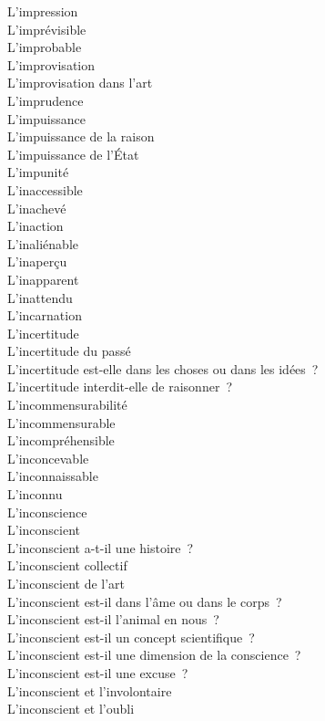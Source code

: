\documentclass[a4paper,12pt]{article}
\begin{document}
L'impression \\
L'imprévisible \\
L'improbable \\
L'improvisation \\
L'improvisation dans l'art \\
L'imprudence \\
L'impuissance \\
L'impuissance de la raison \\
L'impuissance de l'État \\
L'impunité \\
L'inaccessible \\
L'inachevé \\
L'inaction \\
L'inaliénable \\
L'inaperçu \\
L'inapparent \\
L'inattendu \\
L'incarnation \\
L'incertitude \\
L'incertitude du passé \\
L'incertitude est-elle dans les choses ou dans les idées ? \\
L'incertitude interdit-elle de raisonner ? \\
L'incommensurabilité \\
L'incommensurable \\
L'incompréhensible \\
L'inconcevable \\
L'inconnaissable \\
L'inconnu \\
L'inconscience \\
L'inconscient \\
L'inconscient a-t-il une histoire ? \\
L'inconscient collectif \\
L'inconscient de l'art \\
L'inconscient est-il dans l'âme ou dans le corps ? \\
L'inconscient est-il l'animal en nous ? \\
L'inconscient est-il un concept scientifique ? \\
L'inconscient est-il une dimension de la conscience ? \\
L'inconscient est-il une excuse ? \\
L'inconscient et l'involontaire \\
L'inconscient et l'oubli \\
\end{document}
